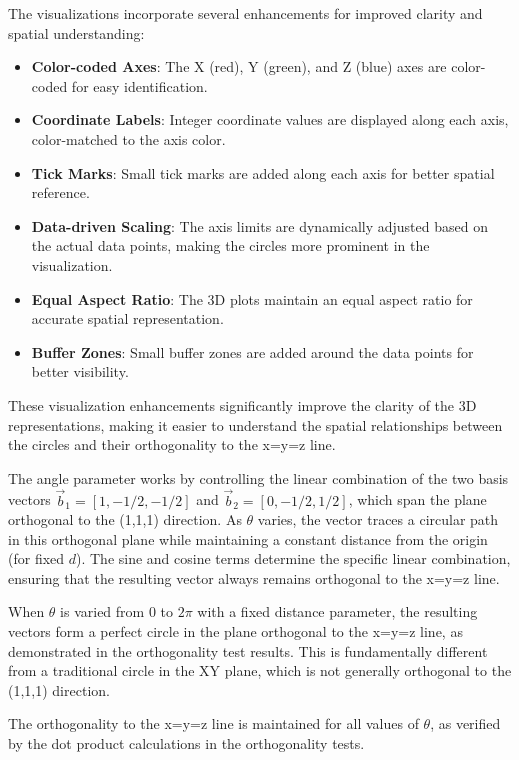The visualizations incorporate several enhancements for improved clarity and spatial understanding:

\begin{itemize}
    \item \textbf{Color-coded Axes}: The X (red), Y (green), and Z (blue) axes are color-coded for easy identification.
    \item \textbf{Coordinate Labels}: Integer coordinate values are displayed along each axis, color-matched to the axis color.
    \item \textbf{Tick Marks}: Small tick marks are added along each axis for better spatial reference.
    \item \textbf{Data-driven Scaling}: The axis limits are dynamically adjusted based on the actual data points, making the circles more prominent in the visualization.
    \item \textbf{Equal Aspect Ratio}: The 3D plots maintain an equal aspect ratio for accurate spatial representation.
    \item \textbf{Buffer Zones}: Small buffer zones are added around the data points for better visibility.
\end{itemize}

These visualization enhancements significantly improve the clarity of the 3D representations, making it easier to understand the spatial relationships between the circles and their orthogonality to the x=y=z line.

The angle parameter works by controlling the linear combination of the two basis vectors $\vec{b}_1 = [1, -1/2, -1/2]$ and $\vec{b}_2 = [0, -1/2, 1/2]$, which span the plane orthogonal to the (1,1,1) direction. As $\theta$ varies, the vector traces a circular path in this orthogonal plane while maintaining a constant distance from the origin (for fixed $d$). The sine and cosine terms determine the specific linear combination, ensuring that the resulting vector always remains orthogonal to the x=y=z line.

When $\theta$ is varied from 0 to $2\pi$ with a fixed distance parameter, the resulting vectors form a perfect circle in the plane orthogonal to the x=y=z line, as demonstrated in the orthogonality test results. This is fundamentally different from a traditional circle in the XY plane, which is not generally orthogonal to the (1,1,1) direction.

The orthogonality to the x=y=z line is maintained for all values of $\theta$, as verified by the dot product calculations in the orthogonality tests.

